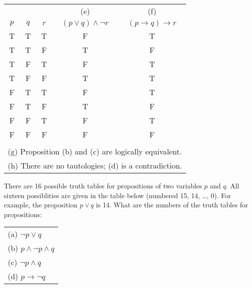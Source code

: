 \documentclass[12pt,addpoints]{exam}
\begin{document}
\begin{questions}
\begin{solution}
    \begin{tabular}{|ccc|c|c|}
    \hline
      & & & (e) & (f) \\
     $p$ & $q$ & $r$ & $(p \vee q) \wedge \neg r$ & $(p \rightarrow q) \rightarrow r$ \\
     \hline
     T & T & T & F & T \\
     T & T & F & T & F \\
     T & F & T & F & T \\
     T & F & F & T & T \\
     F & T & T & F & T \\
     F & T & F & T & F \\
     F & F & T & F & T \\
     F & F & F & F & F \\
     \multicolumn{5}{|c|}{} \\
     \multicolumn{5}{|l|}{(g) Proposition (b) and (c) are logically equivalent.} \\
     \multicolumn{5}{|l|}{(h) There are no tautologies; (d) is a contradiction.} \\
    \hline
    \end{tabular}
   \end{solution}


\question There are 16 possible truth tables for propositions of two variables $p$ and $q$.  All sixteen possiblities are given in the table below (numbered 15, 14, \ldots, 0).  For example, the proposition $p \vee q$ is 14. What are the numbers of the truth tables for propositions:\\
 \begin{tabular}{l}
    (a) $\neg p \vee q$ \\
    (b) $p \wedge \neg p \wedge q$ \\
    (c) $\neg p \wedge q $ \\
    (d) $p \rightarrow \neg q$ \\
 \end{tabular}


\end{questions}
\end{document}
